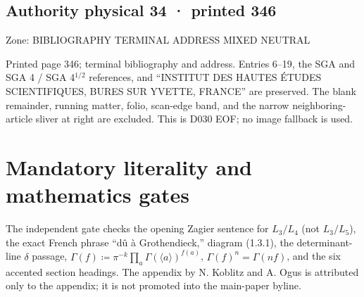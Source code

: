 \documentclass[10pt,twoside]{article}
\begin{document}
\subsection*{Authority physical 34 · printed 346}
\noindent\textsf{Zone: BIBLIOGRAPHY TERMINAL ADDRESS MIXED NEUTRAL}\par
Printed page 346; terminal bibliography and address. Entries 6–19, the SGA and SGA 4 / SGA 4\ensuremath{^{1/2}} references, and “INSTITUT DES HAUTES ÉTUDES SCIENTIFIQUES, BURES SUR YVETTE, FRANCE” are preserved. The blank remainder, running matter, folio, scan-edge band, and the narrow neighboring-article sliver at right are excluded. This is D030 EOF; no image fallback is used.\par
\clearpage
\section*{Mandatory literality and mathematics gates}
The independent gate checks the opening Zagier sentence for $L_3/L_4$ (not $L_3/L_5$), the exact French phrase “dû à Grothendieck,” diagram (1.3.1), the determinant-line $\delta$ passage, $\Gamma(f)≔\pi^{-k}\prod_a\Gamma(\langle a\rangle)^{f(a)}$, $\Gamma(f)^n=\Gamma(nf)$, and the six accented section headings. The appendix by N. Koblitz and A. Ogus is attributed only to the appendix; it is not promoted into the main-paper byline.
\end{document}
